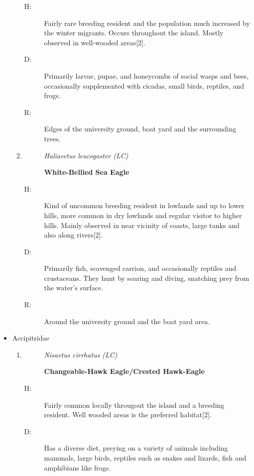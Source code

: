 \begin{itemize}
\begin{enumerate}
\begin{description}
\item[H: ]%
Fairly rare breeding resident and the population much increased by the winter migrants. Occurs throughout the island. Mostly observed in well{-}wooded areas{[}2{]}.%
\item[D: ]%
Primarily larvae, pupae, and honeycombs of social wasps and bees, occasionally supplemented with cicadas, small birds, reptiles, and frogs.%
\item[R: ]%
Edges of the university ground, boat yard and the surrounding trees.%
\end{description}%
\item%
\begin{description}%
\item[]%
\textit{Haliaeetus leucogaster (LC)}%
\item[]%
\textbf{White{-}Bellied Sea Eagle}%
\end{description}%
\begin{description}%
\item[H: ]%
Kind of uncommon breeding resident in lowlands and up to lower hills, more common in dry lowlands and regular visitor to higher hills. Mainly observed in near vicinity of coasts, large tanks and also along rivers{[}2{]}.%
\item[D: ]%
Primarily fish, scavenged carrion, and occasionally reptiles and crustaceans. They hunt by soaring and diving, snatching prey from the water's surface.%
\item[R: ]%
Around the university ground and the boat yard area.%
\end{description}%
\end{enumerate}%
\item%
Accipitridae%
\begin{enumerate}%
\item%
\begin{description}%
\item[]%
\textit{Nisaetus cirrhatus (LC)}%
\item[]%
\textbf{Changeable{-}Hawk Eagle/Crested Hawk{-}Eagle}%
\end{description}%
\begin{description}%
\item[H: ]%
Fairly common locally througout the island and a breeding resident. Well wooded areas is the preferred habitat{[}2{]}.%
\item[D: ]%
Has a diverse diet, preying on a variety of animals including mammals, large birds, reptiles such as snakes and lizards, fish and amphibians like frogs.%

\end{description}
\end{enumerate}
\end{itemize}
